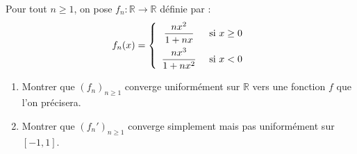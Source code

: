 \documentclass[a4paper,10pt]{report}
\begin{document}
\medskip

\begin{Exercice}{} Pour tout $n \geq 1$, on pose $f_n : \mathbb{R} \rightarrow \mathbb{R}$ définie par :
$$ f_n(x)= \left\lbrace \begin{array}{cl}
\dfrac{nx^2}{1+nx} & \hbox{ si } x \geq 0 \\[0.3cm]
\dfrac{nx^3}{1+nx^2} & \hbox{ si } x < 0 \\
\end{array}\right.$$
\begin{enumerate}
\item Montrer que $(f_n)_{n \geq 1}$ converge uniformément sur $\mathbb{R}$ vers une fonction $f$ que l'on précisera.
\item Montrer que $(f_n')_{n \geq 1}$ converge simplement mais pas uniformément sur $[-1,1]$.
\end{enumerate}
\end{Exercice}
\end{document}
